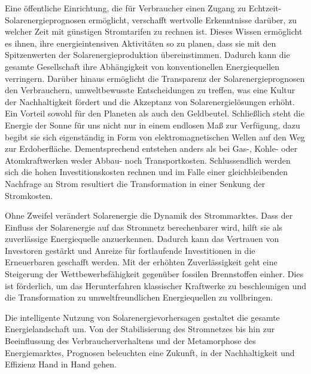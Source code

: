 \documentclass[12pt, a4paper]{article}
\begin{document}
Eine öffentliche Einrichtung, die für Verbraucher einen Zugang zu Echtzeit-Solarenergieprognosen ermöglicht, verschafft wertvolle Erkenntnisse darüber, zu welcher Zeit mit günstigen Stromtarifen zu rechnen ist. Dieses Wissen ermöglicht es ihnen, ihre energieintensiven Aktivitäten so zu planen, dass sie mit den Spitzenwerten der Solarenergieproduktion übereinstimmen. Dadurch kann die gesamte Gesellschaft ihre Abhängigkeit von konventionellen Energiequellen verringern. Darüber hinaus ermöglicht die Transparenz der Solarenergieprognosen den Verbrauchern, umweltbewusste Entscheidungen zu treffen, was eine Kultur der Nachhaltigkeit fördert und die Akzeptanz von Solarenergielösungen erhöht. Ein Vorteil sowohl für den Planeten als auch den Geldbeutel. Schließlich steht die Energie der Sonne für uns nicht nur in einem endlosen Maß zur Verfügung, dazu begibt sie sich eigenständig in Form von elektromagnetischen Wellen auf den Weg zur Erdoberfläche. Dementsprechend entstehen anders als bei Gas-, Kohle- oder Atomkraftwerken weder Abbau- noch Transportkosten. Schlussendlich werden sich die hohen Investitionskosten rechnen und im Falle einer gleichbleibenden Nachfrage an Strom resultiert die Transformation in einer Senkung der Stromkosten.

Ohne Zweifel verändert Solarenergie die Dynamik des Strommarktes. Dass der Einfluss der Solarenergie auf das Stromnetz berechenbarer wird, hilft sie als zuverlässige Energiequelle anzuerkennen. Dadurch kann das Vertrauen von Investoren gestärkt und Anreize für fortlaufende Investitionen in die Erneuerbaren geschafft werden. Mit der erhöhten Zuverlässigkeit geht eine Steigerung der Wettbewerbsfähigkeit gegenüber fossilen Brennstoffen einher. Dies ist förderlich, um das Herunterfahren klassischer Kraftwerke zu beschleunigen und die Transformation zu umweltfreundlichen Energiequellen zu vollbringen.

Die intelligente Nutzung von Solarenergievorhersagen gestaltet die gesamte Energielandschaft um. Von der Stabilisierung des Stromnetzes bis hin zur Beeinflussung des Verbraucherverhaltens und der Metamorphose des Energiemarktes, Prognosen beleuchten eine Zukunft, in der Nachhaltigkeit und Effizienz Hand in Hand gehen.
\end{document}
